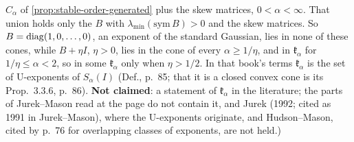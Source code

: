 \begin{proposition}
{$C_\alpha$ of \ref{prop:stable-order-generated} plus the skew matrices, $0 < \alpha < \infty$. That union
holds only the $B$ with $\lambda_{\min}(\mathrm{sym}\,B) > 0$ and the skew matrices. So
$B = \operatorname{diag}(1, 0, \dots, 0)$, an exponent of the standard Gaussian, lies in none of these cones, while
$B + \eta I$, $\eta > 0$, lies in the cone of every $\alpha \ge 1/\eta$, and in $\mathfrak k_\alpha$ for
$1/\eta \le \alpha < 2$, so in some $\mathfrak k_\alpha$ only when $\eta > 1/2$. In that book's terms
$\mathfrak k_\alpha$ is the set of U-exponents of $S_\alpha(I)$ (Def., p.~85; that it is a closed convex cone is
its Prop.~3.3.6, p.~86). \textbf{Not claimed}: a statement of $\mathfrak k_\alpha$ in the literature; the
parts of Jurek--Mason read at the page do not contain it, and Jurek (1992; cited as 1991 in Jurek–Mason), where the U-exponents
originate, and Hudson--Mason, cited by  p.~76 for overlapping classes of
exponents, are not held.)}
\end{proposition}

